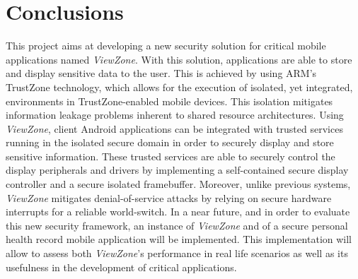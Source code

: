 
% 
% 

\section{Conclusions}
\label{sec:conclusion}

This project aims at developing a new security solution for critical mobile applications named \emph{ViewZone}. With this solution, applications are able to store and display sensitive data to the user. This is achieved by using ARM's TrustZone technology, which allows for the execution of isolated, yet integrated, environments in TrustZone-enabled mobile devices. This isolation mitigates information leakage problems inherent to shared resource architectures. Using \emph{ViewZone}, client Android applications can be integrated with trusted services running in the isolated secure domain in order to securely display and store sensitive information. These trusted services are able to securely control the display peripherals and drivers by implementing a self-contained secure display controller and a secure isolated framebuffer. Moreover, unlike previous systems, \emph{ViewZone} mitigates denial-of-service attacks by relying on secure hardware interrupts for a reliable world-switch. In a near future, and in order to evaluate this new security framework, an instance of \emph{ViewZone} and of a secure personal health record mobile application will be implemented. This implementation will allow to assess both \emph{ViewZone}'s performance in real life scenarios as well as its usefulness in the development of critical applications.